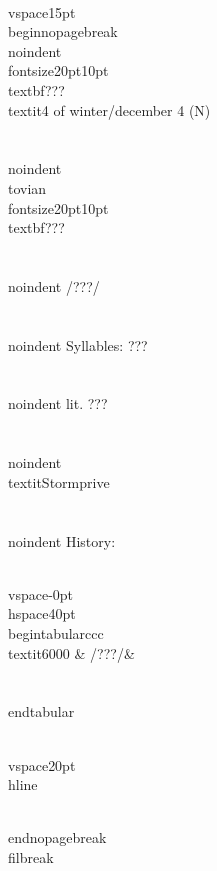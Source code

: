 \\vspace{15pt}
\\begin{nopagebreak}
\\noindent{\\fontsize{20pt}{10pt}\\textbf{???} } \\textit{4 of winter/december 4} (N)\\\\
\\noindent {\\tovian \\fontsize{20pt}{10pt} \\textbf{???} }\\\\
\\noindent /???/\\\\
\\noindent Syllables: ???\\\\
\\noindent lit. ???\\\\
\\noindent \\textit{Stormprive}\\\\


\\noindent History:

\\vspace{-0pt}
\\hspace{40pt}
\\begin{tabular}{ccc}
\\textit{6000} & /???/& \\\\
\\end{tabular}

\\vspace{20pt}\\hline

\\end{nopagebreak}
\\filbreak



